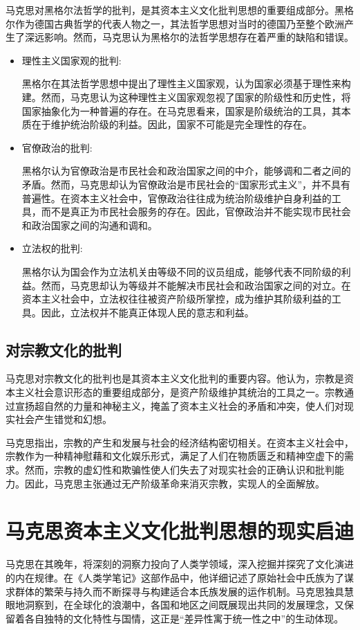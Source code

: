\documentclass[a4paper]{ctexart}
\begin{document}
马克思对黑格尔法哲学的批判，是其资本主义文化批判思想的重要组成部分。黑格尔作为德国古典哲学的代表人物之一，其法哲学思想对当时的德国乃至整个欧洲产生了深远影响。然而，马克思认为黑格尔的法哲学思想存在着严重的缺陷和错误。
\begin{itemize}
    \item {\heiti 理性主义国家观的批判:}
    
    \qquad 黑格尔在其法哲学思想中提出了理性主义国家观，认为国家必须基于理性来构建。然而，马克思认为这种理性主义国家观忽视了国家的阶级性和历史性，将国家抽象化为一种普遍的存在。在马克思看来，国家是阶级统治的工具，其本质在于维护统治阶级的利益。因此，国家不可能是完全理性的存在。

    \item {\heiti 官僚政治的批判:}
    
    \qquad 黑格尔认为官僚政治是市民社会和政治国家之间的中介，能够调和二者之间的矛盾。然而，马克思却认为官僚政治是市民社会的“国家形式主义”，并不具有普遍性。在资本主义社会中，官僚政治往往成为统治阶级维护自身利益的工具，而不是真正为市民社会服务的存在。因此，官僚政治并不能实现市民社会和政治国家之间的沟通和调和。

    \item {\heiti 立法权的批判:}  
    
    \qquad 黑格尔认为国会作为立法机关由等级不同的议员组成，能够代表不同阶级的利益。然而，马克思却认为等级并不能解决市民社会和政治国家之间的对立。在资本主义社会中，立法权往往被资产阶级所掌控，成为维护其阶级利益的工具。因此，立法权并不能真正体现人民的意志和利益。

\end{itemize}

\subsection{对宗教文化的批判}
马克思对宗教文化的批判也是其资本主义文化批判的重要内容。他认为，宗教是资本主义社会意识形态的重要组成部分，是资产阶级维护其统治的工具之一。宗教通过宣扬超自然的力量和神秘主义，掩盖了资本主义社会的矛盾和冲突，使人们对现实社会产生错觉和幻想。

马克思指出，宗教的产生和发展与社会的经济结构密切相关。在资本主义社会中，宗教作为一种精神慰藉和文化娱乐形式，满足了人们在物质匮乏和精神空虚下的需求。然而，宗教的虚幻性和欺骗性使人们失去了对现实社会的正确认识和批判能力。因此，马克思主张通过无产阶级革命来消灭宗教，实现人的全面解放。

\newpage
\section{马克思资本主义文化批判思想的现实启迪}
马克思在其晚年，将深刻的洞察力投向了人类学领域，深入挖掘并探究了文化演进的内在规律。在《人类学笔记》这部作品中，他详细记述了原始社会中氏族为了谋求群体的繁荣与持久而不断探寻与构建适合本氏族发展的运作机制。马克思独具慧眼地洞察到，在全球化的浪潮中，各国和地区之间既展现出共同的发展理念，又保留着各自独特的文化特性与国情，这正是“差异性寓于统一性之中”的生动体现。
\end{document}
